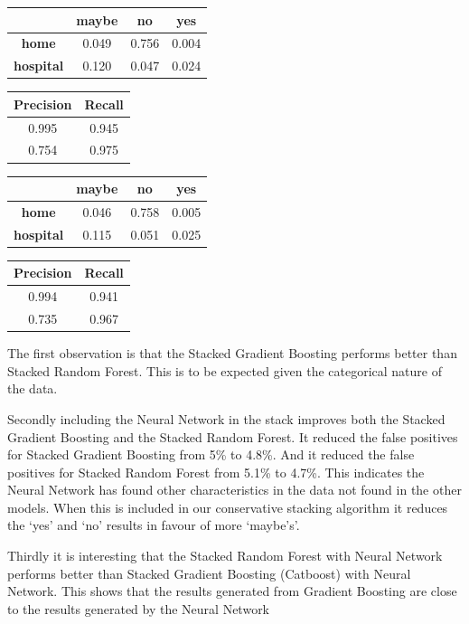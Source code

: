 \begin{table}[ht]
    \bigskip
    \begin{tabular}{c|ccc}
                          & \textbf{maybe} & \textbf{no} & \textbf{yes} \\ \hline
        \textbf{home}     &          0.049 &       0.756 &         0.004 \\
        \textbf{hospital} &          0.120 &       0.047 &         0.024
    \end{tabular}
    \quad\qquad
    \begin{tabular}{cc}
        \textbf{Precision} & \textbf{Recall}  \\ \hline
            0.995 & 0.945  \\
            0.754 & 0.975
    \end{tabular}
    \bigskip
    \begin{tabular}{c|ccc}
                          & \textbf{maybe} & \textbf{no} & \textbf{yes} \\ \hline
        \textbf{home}     &          0.046 &       0.758 &         0.005 \\
        \textbf{hospital} &          0.115 &       0.051 &         0.025
    \end{tabular}
    \quad\qquad
    \begin{tabular}{cc}
        \textbf{Precision} & \textbf{Recall}  \\ \hline
            0.994 & 0.941  \\
            0.735 & 0.967
    \end{tabular}
\end{table}

The first observation is that the Stacked Gradient Boosting performs better than 
Stacked Random Forest. This is to be expected given the categorical nature of
the data.

Secondly including the Neural Network in the stack improves both the Stacked 
Gradient Boosting and the Stacked Random Forest. It reduced the false positives
for Stacked Gradient Boosting from 5\% to 4.8\%. And it reduced the false 
positives for Stacked Random Forest from 5.1\% to 4.7\%. This indicates the
Neural Network has found other characteristics in the data not found in the other
models. When this is included in our conservative stacking algorithm it reduces the 
`yes' and `no' results in favour of more `maybe's'. 

Thirdly it is interesting that the Stacked Random Forest with Neural Network
performs better than Stacked Gradient Boosting (Catboost) with Neural Network.
This shows that the results generated from Gradient Boosting are close to the 
results generated by the Neural Network

